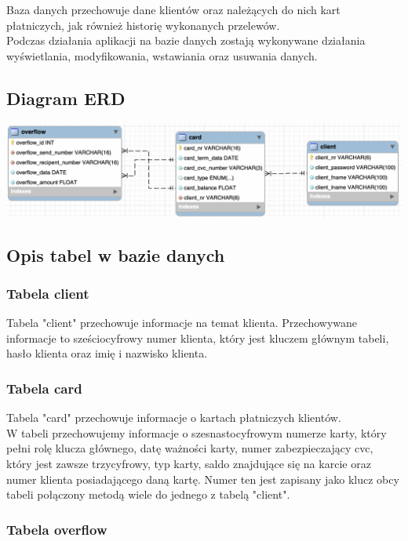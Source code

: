 \documentclass[12pt, letterpaper]{article}
\begin{document}
\quad Baza danych przechowuje dane klientów oraz należących do nich kart płatniczych, jak również  
historię wykonanych przelewów.\\

\quad Podczas działania aplikacji na bazie danych zostają wykonywane działania wyświetlania, modyfikowania, wstawiania oraz usuwania danych.

\subsection{Diagram ERD}

\includegraphics[scale=0.5]{erd}

\subsection{Opis tabel w bazie danych}

\subsubsection{Tabela client}

\quad Tabela "client" przechowuje informacje na temat klienta. Przechowywane informacje to sześciocyfrowy numer klienta, który jest kluczem głównym tabeli, hasło klienta oraz imię i nazwisko klienta.\\


\subsubsection{Tabela card}

\quad Tabela "card" przechowuje informacje o kartach płatniczych klientów.\\ W tabeli przechowujemy informacje o szesnastocyfrowym numerze karty, który pełni rolę klucza głównego, datę ważności karty, numer zabezpieczający cvc, który jest zawsze trzycyfrowy, typ karty, saldo znajdujące się na karcie oraz numer klienta posiadającego daną kartę. Numer ten jest zapisany jako klucz obcy tabeli połączony metodą wiele do jednego z tabelą "client".



\subsubsection{Tabela overflow}
\end{document}
